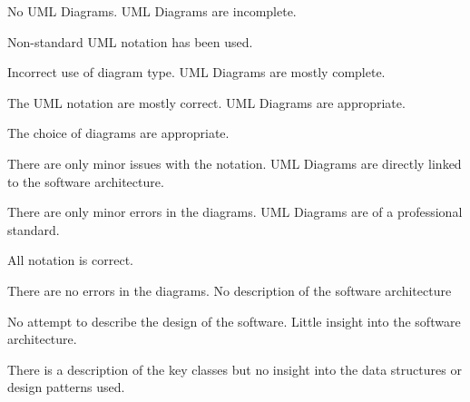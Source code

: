 \documentclass{../../fal_assignment}
\begin{document}
\begin{markingrubric}
	\grade\fail No UML Diagrams.
	\grade UML Diagrams are incomplete.
	\par Non-standard UML notation has been used.
	\par Incorrect use of diagram type.
	\grade UML Diagrams are mostly complete.
	\par The UML notation are mostly correct.
	\grade UML Diagrams are appropriate.
	\par The choice of diagrams are appropriate.
	\par There are only minor issues with the notation.
	\grade UML Diagrams are directly linked to the software architecture.
	\par There are only minor errors in the diagrams.
	\grade UML Diagrams are of a professional standard.
	\par All notation is correct.
	\par There are no errors in the diagrams.
	\grade\fail No description of the software architecture
	\par No attempt to describe the design of the software.
	\grade Little insight into the software architecture.
	\par There is a description of the key classes but no insight into the data structures or design patterns used.

\end{markingrubric}
\end{document}
